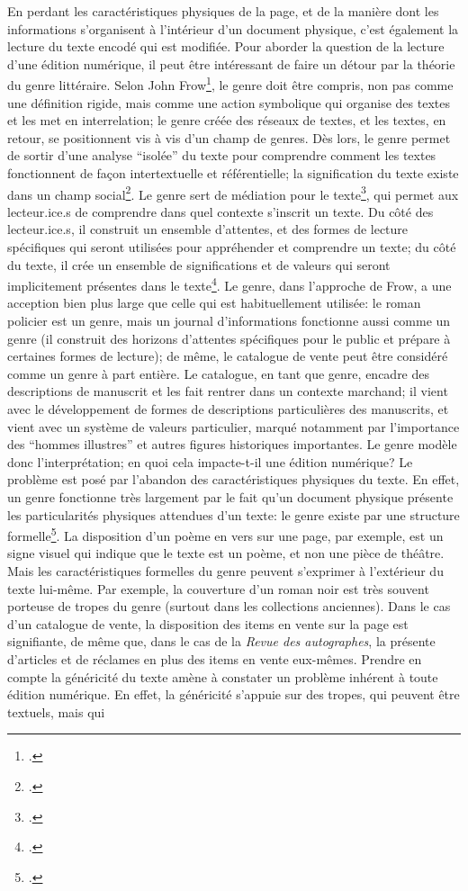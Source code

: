 En perdant les caractéristiques physiques de la page, et de la manière dont les informations s'organisent à l'intérieur d'un document physique, c'est également la lecture du texte encodé qui est modifiée. Pour aborder la question de la lecture d'une édition numérique, il peut être intéressant de faire un détour par la théorie du genre littéraire. Selon John Frow\footcite{frow_genre_2006}, le genre doit être compris, non pas comme une définition rigide, mais comme une action symbolique qui organise des textes et les met en interrelation; le genre créée des réseaux de textes, et les textes, en retour, se positionnent vis à vis d'un champ de genres. Dès lors, le genre permet de sortir d'une analyse \enquote{isolée} du texte pour comprendre comment les textes fonctionnent de façon intertextuelle et référentielle; la signification du texte existe dans un champ social\footcite[p. 2, 10]{frow_genre_2006}. Le genre sert de médiation pour le texte\footcite[p. 14]{frow_genre_2006}, qui permet aux lecteur.ice.s de comprendre dans quel contexte s'inscrit un texte. Du côté des lecteur.ice.s, il construit un ensemble d'attentes, et des formes de lecture spécifiques qui seront utilisées pour appréhender et comprendre un texte; du côté du texte, il crée un ensemble de significations et de valeurs qui seront implicitement présentes dans le texte\footcite[p. 83-87]{frow_genre_2006}. Le genre, dans l'approche de Frow, a une acception bien plus large que celle qui est habituellement utilisée: le roman policier est un genre, mais un journal d'informations fonctionne aussi comme un genre (il construit des horizons d'attentes spécifiques pour le public et prépare à certaines formes de lecture); de même, le catalogue de vente peut être considéré comme un genre à part entière. Le catalogue, en tant que genre, encadre des descriptions de manuscrit et les fait rentrer dans un contexte marchand; il vient avec le développement de formes de descriptions particulières des manuscrits, et vient avec un système de valeurs particulier, marqué notamment par l'importance des \enquote{hommes illustres} et autres figures historiques importantes. Le genre modèle donc l'interprétation; en quoi cela impacte-t-il une édition numérique? Le problème est posé par l'abandon des caractéristiques physiques du texte. En effet, un genre fonctionne très largement par le fait qu'un document physique présente les particularités physiques attendues d'un texte: le genre existe par une structure formelle\footcite[p. 19]{frow_genre_2006}. La disposition d'un poème en vers sur une page, par exemple, est un signe visuel qui indique que le texte est un poème, et non une pièce de théâtre. Mais les caractéristiques formelles du genre peuvent s'exprimer à l'extérieur du texte lui-même. Par exemple, la couverture d'un roman noir est très souvent porteuse de tropes du genre (surtout dans les collections anciennes). Dans le cas d'un catalogue de vente, la disposition des items en vente sur la page est signifiante, de même que, dans le cas de la \textit{Revue des autographes}, la présente d'articles et de réclames en plus des items en vente eux-mêmes. Prendre en compte la généricité du texte amène à constater un problème inhérent à toute édition numérique. En effet, la généricité s'appuie sur des tropes, qui peuvent être textuels, mais qui 